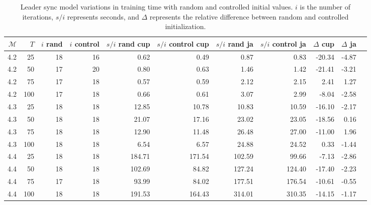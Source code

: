 \begin{table*}
    \centering
    \caption{Leader sync model variations in training time with random and controlled initial values. $i$ is the number of iterations, $s/i$ represents seconds, and $\Delta$ represents the relative difference between random and controlled initialization.}
    \label{tab:leader_results_rand_vs_semi}
    \begin{tabular}{rrrrrrrrrrr}
        \toprule
        $\mathcal{M}$ & $T$ & $i$ rand & $i$ control & $s/i$ rand cup & $s/i$ control cup & $s/i$ rand ja & $s/i$ control ja & $\Delta$ cup & $\Delta$ ja \\
        \midrule
        4.2           & 25  & 18       & 16          & 0.62           & 0.49              & 0.87          & 0.83             & -20.34       & -4.87       \\
        4.2           & 50  & 17       & 20          & 0.80           & 0.63              & 1.46          & 1.42             & -21.41       & -3.21       \\
        4.2           & 75  & 17       & 18          & 0.57           & 0.59              & 2.12          & 2.15             & 2.41         & 1.27        \\
        4.2           & 100 & 17       & 18          & 0.66           & 0.61              & 3.07          & 2.99             & -8.04        & -2.58       \\
        4.3           & 25  & 18       & 18          & 12.85          & 10.78             & 10.83         & 10.59            & -16.10       & -2.17       \\
        4.3           & 50  & 18       & 18          & 21.07          & 17.16             & 23.02         & 23.05            & -18.56       & 0.16        \\
        4.3           & 75  & 18       & 18          & 12.90          & 11.48             & 26.48         & 27.00            & -11.00       & 1.96        \\
        4.3           & 100 & 18       & 18          & 6.54           & 6.57              & 24.88         & 24.52            & 0.33         & -1.44       \\
        4.4           & 25  & 18       & 18          & 184.71         & 171.54            & 102.59        & 99.66            & -7.13        & -2.86       \\
        4.4           & 50  & 18       & 18          & 102.69         & 84.82             & 127.24        & 124.40           & -17.40       & -2.23       \\
        4.4           & 75  & 17       & 18          & 93.99          & 84.02             & 177.51        & 176.54           & -10.61       & -0.55       \\
        4.4           & 100 & 18       & 18          & 191.53         & 164.43            & 314.01        & 310.35           & -14.15       & -1.17       \\
        \bottomrule
    \end{tabular}
\end{table*}

